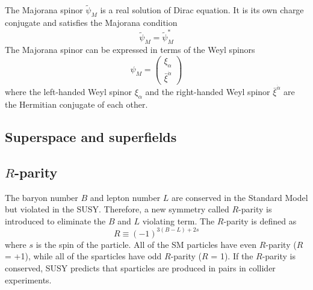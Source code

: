 The Majorana spinor $\tilde{\psi}_{M}$ is a real solution of Dirac equation.
It is its own charge conjugate and satisfies the Majorana condition
%
\begin{equation}
\tilde{\psi}_{M} = \tilde{\psi}_{M}^{*}
\label{eq:susy_majorana_condition}
\end{equation}
%
The Majorana spinor can be expressed in terms of the Weyl spinors
%
\begin{equation}
\psi_{M} = \left(\begin{matrix}\xi_{\alpha}\\\bar{\xi}^{\dot{\alpha}}\end{matrix}\right)
\label{eq:susy_majorana_spinor}
\end{equation}
%
where the left-handed Weyl spinor $\xi_{\alpha}$ and the right-handed Weyl spinor $\bar{\xi}^{\dot{\alpha}}$ are the Hermitian conjugate of each other.



\subsection{Superspace and superfields}
\label{subsec:susy_superspace_and_superfields}


\subsection{$R$-parity}
\label{subsec:susy_r_parity}
The baryon number $B$ and lepton number $L$ are conserved in the Standard Model but violated in the SUSY.
Therefore, a new symmetry called $R$-parity is introduced to eliminate the $B$ and $L$ violating term.
The $R$-parity is defined as
%
\begin{equation}
R \equiv (-1)^{3(B-L)+2s}
\label{eq:susy_r_parity}
\end{equation}
%
where $s$ is the spin of the particle.
All of the SM particles have even $R$-parity ($R$ = +1), while all of the sparticles have odd $R$-parity ($R$ =  1). 
If the $R$-parity is conserved, SUSY predicts that sparticles are produced in pairs in collider experiments.

